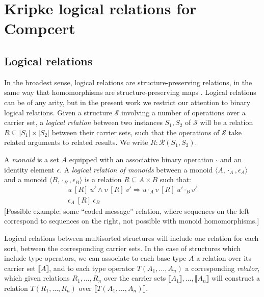 \documentclass[sigplan,10pt,review,anonymous]{acmart}
\newcommand{\ifr}[1]{\ [{#1}]\ }
\begin{document}

\section{Kripke logical relations for Compcert} %


\subsection{Logical relations} %

In the broadest sense,
logical relations are structure-preserving relations,
in the same way that homomorphisms are structure-preserving maps
\citep{lrp}.
Logical relations can be of any arity,
but in the present work
we restrict our attention to
binary logical relations.
Given a structure $\mathcal{S}$
involving a number of operations over a carrier set,
a \emph{logical relation}
between two instances $S_1, S_2$ of $\mathcal{S}$
will be a relation $R \subseteq |S_1| \times |S_2|$
between their carrier sets,
such that the operations of $\mathcal{S}$
take related arguments to related results.
We write $R : \mathcal{R}(S_1, S_2)$.

\begin{example}
\label{ex:monoid}
A \emph{monoid} is a set $A$ equipped with
an associative binary operation $\cdot$ and
an identity element $\epsilon$.
A \emph{logical relation of monoids} between
a monoid $\langle A, \cdot_A, \epsilon_A \rangle$ and
a monoid $\langle B, \cdot_B, \epsilon_B \rangle$
is a relation $R \subseteq A \times B$
such that:
\begin{gather*}
u \ifr{R} u' \wedge v \ifr{R} v' \Rightarrow u \cdot_A v \ifr{R} u' \cdot_B v' \\
\epsilon_A \ifr{R} \epsilon_B
\end{gather*}
[Possible example: some ``coded message'' relation,
where sequences on the left correspond to sequences on the right,
not possible with monoid homomorphisms.]
\end{example}

Logical relations between multisorted structures
will include one relation for each sort,
between the corresponding carrier sets.
In the case of structures which include type operators,
we can associate to each base type $A$
a relation over its carrier set $\llbracket A \rrbracket$,
and to each type operator $T(A_1, \ldots, A_n)$
a corresponding \emph{relator},
which given relations $R_1, \ldots, R_n$ over
the carrier sets $\llbracket A_1 \rrbracket, \ldots, \llbracket A_n \rrbracket$
will construct a relation $T(R_1, \ldots, R_n)$
over $\llbracket T(A_1, \ldots, A_n) \rrbracket$.
\end{document}
